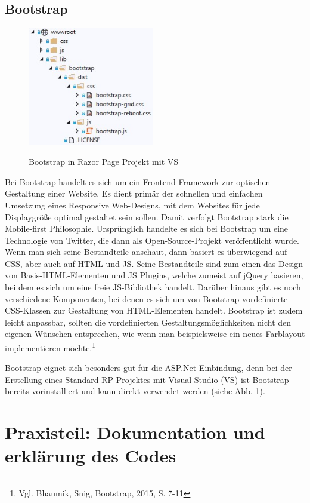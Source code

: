 \documentclass[a4paper,
12pt,
oneside]
{article}
\newcommand{\sPar}{\par\vspace*{6pt}}
\begin{document}
	\subsection{Bootstrap}
	 \begin{figure}
	 	\centering
	 	\caption{Bootstrap in Razor Page Projekt mit VS} 
	 	\includegraphics[width=5.5cm]{img/bootstrap_asp.jpg} \\
	 	\label{fig:bootstrap_asp}
	 \end{figure}
	Bei Bootstrap handelt es sich um ein Frontend-Framework zur optischen Gestaltung einer Website. Es dient primär der schnellen und einfachen Umsetzung eines Responsive Web-Designs, mit dem Websites für jede Displaygröße optimal gestaltet sein sollen. Damit verfolgt Bootstrap stark die Mobile-first Philosophie. Ursprünglich handelte es sich bei Bootstrap um eine Technologie von Twitter, die dann als Open-Source-Projekt veröffentlicht wurde. Wenn man sich seine Bestandteile anschaut, dann basiert es überwiegend auf CSS, aber auch auf HTML und JS. Seine Bestandteile sind zum einen das Design von Basis-HTML-Elementen und JS Plugins, welche zumeist auf jQuery basieren, bei dem es sich um eine freie JS-Bibliothek handelt. 
	Darüber hinaus gibt es noch verschiedene Komponenten, bei denen es sich um von Bootstrap vordefinierte CSS-Klassen zur Gestaltung von HTML-Elementen handelt. Bootstrap ist zudem leicht anpassbar, sollten die vordefinierten Gestaltungsmöglichkeiten nicht den eigenen Wünschen entsprechen, wie wenn man beispielsweise ein neues Farblayout implementieren möchte.\footnote{Vgl. Bhaumik, Snig, Bootstrap, 2015, S. 7-11} \sPar
	Bootstrap eignet sich besonders gut für die ASP.Net Einbindung, denn bei der Erstellung eines Standard RP Projektes mit Visual Studio (VS) ist Bootstrap bereits vorinstalliert und kann direkt verwendet werden (siehe Abb. \ref{fig:bootstrap_asp}).
	\clearpage
	
	
	
	
	
	\section{Praxisteil: Dokumentation und erklärung des Codes}
	
\end{document}
